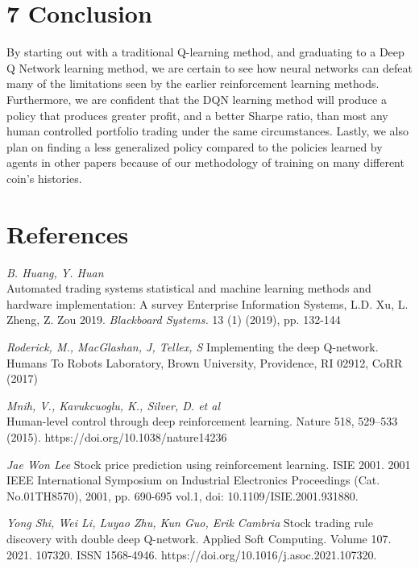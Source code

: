 \documentclass[letterpaper]{article}
\begin{document}
\section{7 Conclusion}
By starting out with a traditional Q-learning method, and graduating to a Deep Q Network learning method, we are certain to see how neural networks can defeat many of the limitations seen by the earlier reinforcement learning methods. Furthermore, we are confident that the DQN learning method will produce a policy that produces greater profit, and a better Sharpe ratio, than most any human controlled portfolio trading under the same circumstances. Lastly, we also plan on finding a less generalized policy compared to the policies learned by agents in other papers because of our methodology of training on many different coin's histories. 

\section{References}
\smallskip \noindent \textit{B. Huang, Y. Huan}\\
Automated trading systems statistical and machine learning methods and hardware implementation: A survey Enterprise Information Systems, L.D. Xu, L. Zheng, Z. Zou 2019. \textit{Blackboard Systems.} 13 (1) (2019), pp. 132-144

\smallskip \noindent \textit{Roderick, M., MacGlashan, J, Tellex, S} 
Implementing the deep Q-network.  Humans To Robots Laboratory, Brown University, Providence, RI 02912, CoRR (2017)

\smallskip \noindent \textit{Mnih, V., Kavukcuoglu, K., Silver, D. et al}\\
Human-level control through deep reinforcement learning. Nature 518, 529–533 (2015). 
https://doi.org/10.1038/nature14236

\smallskip \noindent \textit{Jae Won Lee} 
Stock price prediction using reinforcement learning. ISIE 2001. 2001 IEEE International Symposium on Industrial Electronics Proceedings (Cat. No.01TH8570), 2001, pp. 690-695 vol.1, 
doi: 10.1109/ISIE.2001.931880.

\smallskip \noindent \textit{Yong Shi, Wei Li, Luyao Zhu, Kun Guo, Erik Cambria}
Stock trading rule discovery with double deep Q-network. Applied Soft Computing. Volume 107. 2021. 107320. ISSN 1568-4946.
https://doi.org/10.1016/j.asoc.2021.107320.
\end{document}
